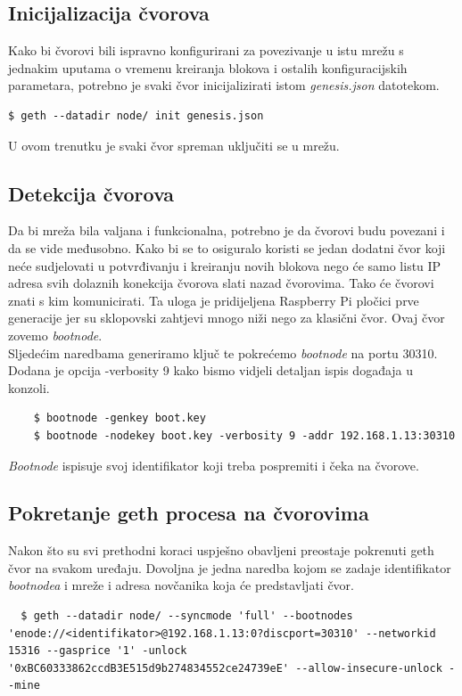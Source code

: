 \documentclass[times, utf8, zavrsni, numeric]{fer}
\begin{document}
\subsection{Inicijalizacija čvorova}
Kako bi čvorovi bili ispravno konfigurirani za povezivanje u istu mrežu s jednakim uputama o vremenu kreiranja blokova i ostalih konfiguracijskih
parametara, potrebno je svaki čvor inicijalizirati istom \emph{genesis.json} datotekom. 

\begin{lstlisting}
$ geth --datadir node/ init genesis.json
\end{lstlisting}
U ovom trenutku je svaki čvor spreman uključiti se u mrežu.
\subsection{Detekcija čvorova}
Da bi mreža bila valjana i funkcionalna, potrebno je da čvorovi budu povezani i da se vide međusobno.
Kako bi se to osiguralo koristi se jedan dodatni čvor koji neće sudjelovati u potvrđivanju i kreiranju novih blokova
nego će samo listu IP adresa svih dolaznih konekcija čvorova slati nazad čvorovima. Tako će čvorovi znati s kim komunicirati.
Ta uloga je pridijeljena Raspberry Pi pločici prve generacije jer su sklopovski zahtjevi mnogo niži nego za klasični čvor.
Ovaj čvor zovemo \emph{bootnode}. \\
Sljedećim naredbama generiramo ključ te pokrećemo \emph{bootnode} na portu 30310. Dodana je opcija -verbosity 9 kako bismo vidjeli
detaljan ispis događaja u konzoli. 

\begin{lstlisting}
    $ bootnode -genkey boot.key
    $ bootnode -nodekey boot.key -verbosity 9 -addr 192.168.1.13:30310
\end{lstlisting}

\emph{Bootnode} ispisuje svoj identifikator koji treba pospremiti i čeka na čvorove.
\subsection{Pokretanje geth procesa na čvorovima}
Nakon što su svi prethodni koraci uspješno obavljeni preostaje pokrenuti geth čvor na svakom uređaju. Dovoljna je jedna naredba
kojom se zadaje identifikator \emph{bootnodea} i mreže i adresa novčanika koja će predstavljati čvor. 

\begin{lstlisting}
  $ geth --datadir node/ --syncmode 'full' --bootnodes 'enode://<identifikator>@192.168.1.13:0?discport=30310' --networkid 15316 --gasprice '1' -unlock '0xBC60333862ccdB3E515d9b274834552ce24739eE' --allow-insecure-unlock --mine
\end{lstlisting}
\end{document}
